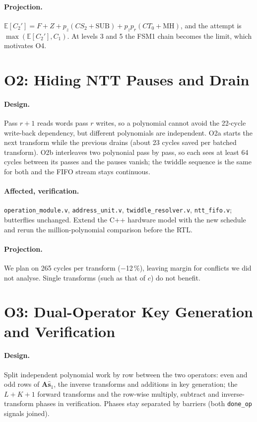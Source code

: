 \documentclass[12pt,a4paper]{report}
\newcommand{\code}[1]{\texttt{#1}}
\begin{document}
\paragraph{Projection.}
$\mathbb{E}[C_2']=F+Z+p_z(CS_2+\text{SUB})+p_zp_r(CT_0+\text{MH})$, and the attempt is $\max(\mathbb{E}[C_2'],C_1)$. At levels 3 and 5 the FSM1 chain becomes the limit, which motivates O4.

\section{O2: Hiding NTT Pauses and Drain}
\paragraph{Design.}
Pass $r{+}1$ reads words pass $r$ writes, so a polynomial cannot avoid the 22-cycle write-back dependency, but different polynomials are independent. O2a starts the next transform while the previous drains (about 23 cycles saved per batched transform). O2b interleaves two polynonial pass by pass, so each sees at least 64 cycles between its passes and the pauses vanish; the twiddle sequence is the same for both and the FIFO stream stays continuous.

\paragraph{Affected, verification.}
\code{operation\_module.v}, \code{address\_unit.v}, \code{twiddle\_resolver.v}, \code{ntt\_fifo.v}; butterflies unchanged. Extend the C++ hardware model with the new schedule and rerun the million-polynomial comparison before the RTL.

\paragraph{Projection.}
We plan on 265 cycles per transform ($-$12\,\%), leaving margin for conflicts we did not analyse. Single transforms (such as that of $c$) do not benefit.

\section{O3: Dual-Operator Key Generation and Verification}
\paragraph{Design.}
Split independent polynomial work by row between the two operators: even and odd rows of $\mathbf{A}\hat{\mathbf{s}}_1$, the inverse transforms and additions in key generation; the $L{+}K{+}1$ forward transforms and the row-wise multiply, subtract and inverse-transform phases in verification. Phases stay separated by barriers (both \code{done\_op} signals joined).
\end{document}
